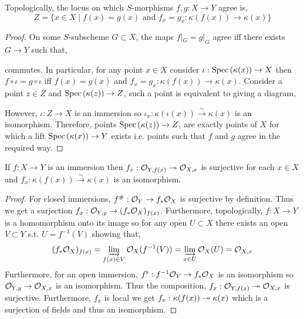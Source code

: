 \documentclass[12pt]{article}
\begin{document}
\begin{lemma}
Topologically, the locus on which $S$-morphisms $f, g : X \to Y$ agree is,
\[ Z = \{ x \in X \mid f(x) = g(x) \text{ and } f_x = g_x : \kappa(f(x)) \to \kappa(x) \} \]
\end{lemma}

\begin{proof}
On some $S$-subscheme $G \subset X$, the maps $f|_G = g|_G$ agree iff there exists $G \to Y$ such that,
\begin{center}
\end{center}
commutes. In particular, for any point $x \in X$ consider $\iota : \mathrm{Spec}\left( \kappa(x) \right) \to X$ then $f \circ \iota = g \circ \iota$ iff $f(x) = g(x)$ and $f_x = g_x : \kappa(f(x)) \to \kappa(x)$. Consider a point $z \in Z$ and $\mathrm{Spec}\left( \kappa(z) \right) \to Z$, such a point is equivalent to giving a diagram,
\begin{center}
\end{center}
However, $\iota : Z \to X$ is an immersion so $\iota_x : \kappa(\iota(x)) \xrightarrow{\sim} \kappa(x)$ is an isomorphism. Therefore, points $\mathrm{Spec}\left( \kappa(z) \right) \to Z$, are exactly points of $X$ for which a lift $\mathrm{Spec}\left( \kappa(x) \right) \to Y$ exists i.e. points such that $f$ and $g$ agree in the required way.
\end{proof}

\begin{lemma}
If $f : X \to Y$ is an immersion then $f_x : \mathcal{O}_{Y, f(x)} \twoheadrightarrow \mathcal{O}_{X, x}$ is surjective for each $x \in X$ and $f_x : \kappa(f(x)) \xrightarrow{\sim} \kappa(x)$ is an isomorphism.
\end{lemma}

\begin{proof}
For closed immersions, $f^{\#} : \mathcal{O}_{Y} \to f_* \mathcal{O}_{X}$ is surjective by definition. Thus we get a surjection $f_x : \mathcal{O}_{Y, y} \to (f_* \mathcal{O}_{X})_{f(x)}$. Furthermore, topologically, $f : X \to Y$ is a homomorphism onto its image so for any open $U \subset X$ there exists an open $V \subset Y$ s.t. $U = f^{-1}(V)$ showing that,
\[ (f_* \mathcal{O}_{X})_{f(x)} = \varinjlim_{f(x) \in V} \mathcal{O}_{X}(f^{-1}(V)) = \varinjlim_{x \in U} \mathcal{O}_{X}(U) = \mathcal{O}_{X, x} \]
Furthermore, for an open immersion, $f^\flat : f^{-1} \mathcal{O}_{Y} \to f_* \mathcal{O}_{X}$ is an isomorphism so $\mathcal{O}_{Y, y} \to \mathcal{O}_{X, x}$ is an isomorphism. Thus the composition, $f_x : \mathcal{O}_{Y, f(x)} \twoheadrightarrow \mathcal{O}_{X, x}$ is surjective. Furthermore, $f_x$ is local we get $f_x : \kappa(f(x)) \twoheadrightarrow \kappa(x)$ which is a surjection of fields and thus an isomorphism. 
\end{proof}
\end{document}

